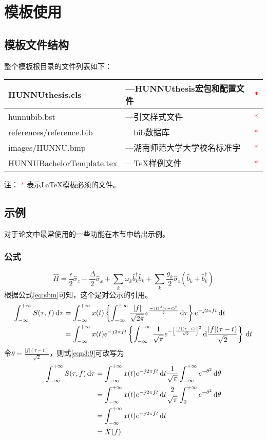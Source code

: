 \chapter{模板使用}
\section{模板文件结构\label{sec:files}}
整个模板根目录的文件列表如下：
\begin{center}
\begin{tabular}{|l|l|l|}
\hline
HUNNUthesis.cls & ---HUNNUthesis宏包和配置文件 & \textcolor{red}{{*}}\\
\hline
hunnubib.bst & ---引文样式文件 & \textcolor{red}{{*}}\\
\hline
references/reference.bib & ---bib数据库 & \textcolor{red}{{*}}\\
\hline
images/HUNNU.bmp & ---湖南师范大学大学校名标准字 & \textcolor{red}{{*}}\\
\hline
HUNNUBachelorTemplate.tex & ---\TeX{}样例文件 &\textcolor{red}{{*}}\\
\hline
\end{tabular}
\end{center}
注： \textcolor{red}{{*}} 表示\LaTeX{}模板必须的文件。
\section{示例}
对于论文中最常使用的一些功能在本节中给出示例。
\subsection{公式}
\begin{equation}
\hat{H}=\frac{\epsilon}{2}\hat{\sigma}_{z}-\frac{\Delta}{2}\hat{\sigma}_{x}+\sum_{k}\omega_{k}\hat{b}_{k}^{\dagger}\hat{b}_{k}+\sum_{k}\frac{g_{k}}{2}\hat{\sigma}_{z}(\hat{b}_{k}+\hat{b}_{k}^{\dagger})\label{eq:sbm}
\end{equation}
根据公式\ref{eq:sbm}可知，这个是对公示的引用。
\begin{align}\label{eqn3:9}
\int_{-\infty}^{+\infty}S(\tau,f)\,\mathrm{d}\tau&=\int_{-\infty}^{+\infty}x(t)\left\{\int_{-\infty}^{+\infty}\frac{|f|}{\sqrt{2\pi}}e^{\frac{-|f|^2(\tau-t)^2}{2}}\,\mathrm{d}\tau\right\}e^{-j2\pi ft}\,\mathrm{d}t\notag\\
&=\int_{-\infty}^{+\infty}x(t)e^{-j2\pi ft}\left\{\int_{-\infty}^{+\infty}\frac{1}{\sqrt{\pi}}e^{-\left[\frac{|f|(\tau-t)}{\sqrt{2}}\right]^2}\,\mathrm{d}\frac{|f|(\tau-t)}{\sqrt{2}}\right\}\,\mathrm{d}t
\end{align}
令$\theta=\frac{|f|(\tau-t)}{\sqrt{2}}$，则式\eqref{eqn3:9}可改写为
\begin{align}\label{eqn3:10}
\int_{-\infty}^{+\infty}S(\tau,f)\,\mathrm{d}\tau&=\int_{-\infty}^{+\infty}x(t)e^{-j2\pi ft}\,\mathrm{d}t\frac{1}{\sqrt{\pi}}\int_{-\infty}^{+\infty}e^{-\theta^2}\,\mathrm{d}\theta\notag\\
&=\int_{-\infty}^{+\infty}x(t)e^{-j2\pi ft}\,\mathrm{d}t\frac{2}{\sqrt{\pi}}\int_{0}^{+\infty}e^{-\theta^2}\,\mathrm{d}\theta\notag\\
&=\int_{-\infty}^{+\infty}x(t)e^{-j2\pi ft}\,\mathrm{d}t\notag\\
&=X(f)
\end{align}
